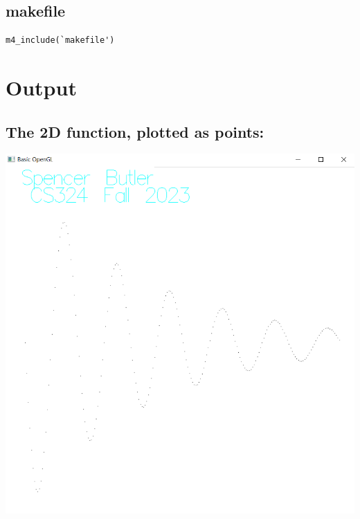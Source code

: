 \documentclass[12pt]{article}
\begin{document}
\subsection{makefile}
\begin{verbatim}
m4_include(`makefile')
\end{verbatim}

\section{Output}

\subsection{The 2D function, plotted as points:}
\noindent \includegraphics{screens/points}
\end{document}
